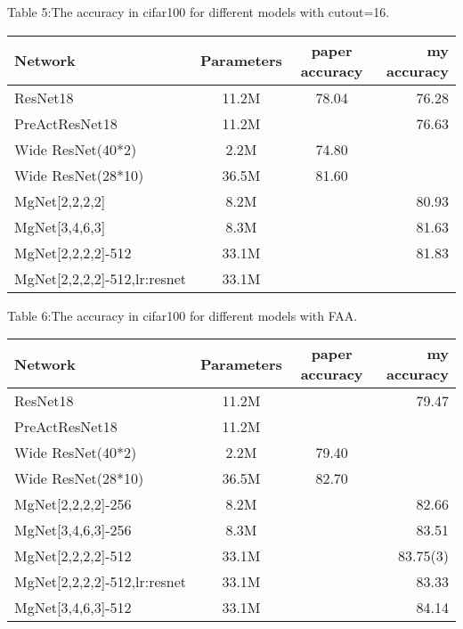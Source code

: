 \vbox{}
Table 5:The accuracy in cifar100 for different models with cutout=16.\\
\begin{tabular}{| l | c | c | r |}
	\hline
	Network                &     Parameters   &       paper accuracy   &   my accuracy     \\
	\hline
	ResNet18               &      11.2M      &         78.04           &      76.28         \\
	\hline
	PreActResNet18         &      11.2M      &                         &      76.63         \\
	\hline
	Wide ResNet(40*2)      &      2.2M       &         74.80           &              \\
	\hline
	Wide ResNet(28*10)     &      36.5M      &         81.60           &               \\
	\hline
	MgNet[2,2,2,2]         &      8.2M       &                         &       80.93         \\
	\hline
	MgNet[3,4,6,3]         &      8.3M       &                         &       81.63          \\
	\hline
	MgNet[2,2,2,2]-512     &      33.1M      &                        &       81.83         \\
	\hline
	MgNet[2,2,2,2]-512,lr:resnet  &      33.1M      &                        &                \\
	\hline
\end{tabular}



\vbox{}
Table 6:The accuracy in cifar100 for different models with FAA.\\
\begin{tabular}{| l | c | c | r |}
	\hline
	Network                &     Parameters   &       paper accuracy   &   my accuracy     \\
	\hline
	ResNet18               &      11.2M      &                         &      79.47         \\
	\hline
	PreActResNet18         &      11.2M      &                         &                  \\
	\hline
	Wide ResNet(40*2)      &      2.2M       &         79.40           &              \\
	\hline
	Wide ResNet(28*10)     &      36.5M      &         82.70           &               \\
	\hline
	MgNet[2,2,2,2]-256     &      8.2M       &                         &       82.66         \\
	\hline
	MgNet[3,4,6,3]-256     &      8.3M       &                         &       83.51          \\
	\hline
	MgNet[2,2,2,2]-512     &      33.1M      &                        &       83.75(3)         \\
	\hline
	MgNet[2,2,2,2]-512,lr:resnet&      33.1M      &              &       83.33         \\
	\hline
	MgNet[3,4,6,3]-512     &      33.1M      &              &       84.14         \\
	\hline
\end{tabular}

